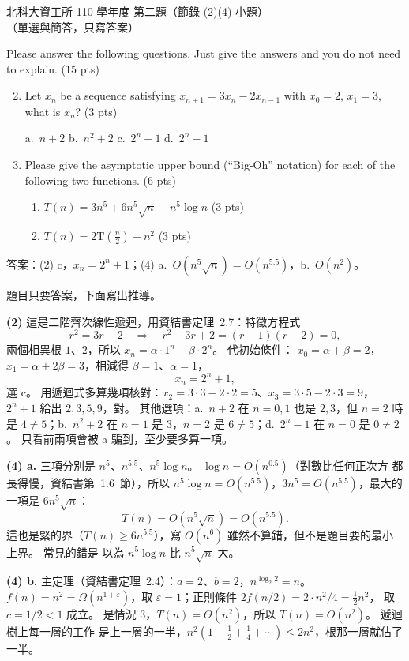 \begin{pastexam}[label={px:ntut-110-ci-01}]{北科大資工所 110 學年度 第二題（節錄 (2)(4) 小題）}
（單選與簡答，只寫答案）

Please answer the following questions. Just give the answers and you do not need to explain.
(15 pts)
\begin{enumerate}[label=(\arabic*)]
\setcounter{enumi}{1}
\item Let $x_n$ be a sequence satisfying $x_{n+1}=3x_n-2x_{n-1}$ with $x_0=2$, $x_1=3$, what is
$x_n$? (3 pts)

a.~$n+2$ \qquad b.~$n^2+2$ \qquad c.~$2^n+1$ \qquad d.~$2^n-1$
\setcounter{enumi}{3}
\item Please give the asymptotic upper bound (``Big-Oh'' notation) for each of the following two
functions. (6 pts)
\begin{enumerate}[label=\alph*.]
\item $T(n)=3n^5+6n^5\sqrt{n}+n^5\log n$ \quad (3 pts)
\item $T(n)=2\mathrm{T}(\frac{n}{2})+n^2$ \quad (3 pts)
\end{enumerate}
\end{enumerate}
\end{pastexam}

\begin{pastsoln}
答案：(2) c，$x_n = 2^n + 1$；(4) a.\ $O(n^5 \sqrt{n}) = O(n^{5.5})$，b.\ $O(n^2)$。

題目只要答案，下面寫出推導。

\textbf{(2)} 這是二階齊次線性遞迴，用資結書定理~2.7：特徵方程式
\[
r^2 = 3r - 2 \quad\Longrightarrow\quad r^2 - 3r + 2 = (r - 1)(r - 2) = 0 ,
\]
兩個相異根 $1$、$2$，所以 $x_n = \alpha \cdot 1^n + \beta \cdot 2^n$。 代初始條件：
$x_0 = \alpha + \beta = 2$，$x_1 = \alpha + 2\beta = 3$，相減得 $\beta = 1$、$\alpha = 1$，
\[
x_n = 2^n + 1 ,
\]
選 c。 用遞迴式多算幾項核對：$x_2 = 3 \cdot 3 - 2 \cdot 2 = 5$、$x_3 = 3 \cdot 5 - 2 \cdot 3 = 9$，
$2^n + 1$ 給出 $2, 3, 5, 9$，對。 其他選項：a.\ $n + 2$ 在 $n = 0, 1$ 也是 $2, 3$，但 $n = 2$ 時是
$4 \ne 5$；b.\ $n^2 + 2$ 在 $n = 1$ 是 $3$，$n = 2$ 是 $6 \ne 5$；d.\ $2^n - 1$ 在 $n = 0$ 是 $0 \ne 2$。
只看前兩項會被 a 騙到，至少要多算一項。

\textbf{(4) a.} 三項分別是 $n^5$、$n^{5.5}$、$n^5 \log n$。 $\log n = O(n^{0.5})$（對數比任何正次方
都長得慢，資結書第~1.6~節），所以 $n^5 \log n = O(n^{5.5})$，$3n^5 = O(n^{5.5})$，最大的一項是
$6n^5\sqrt{n}$：
\[
T(n) = O(n^5 \sqrt{n}) = O(n^{5.5}) .
\]
這也是緊的界（$T(n) \ge 6 n^{5.5}$），寫 $O(n^6)$ 雖然不算錯，但不是題目要的最小上界。 常見的錯是
以為 $n^5 \log n$ 比 $n^5\sqrt{n}$ 大。

\textbf{(4) b.} 主定理（資結書定理~2.4）：$a = 2$、$b = 2$，$n^{\log_2 2} = n$。 $f(n) = n^2 =
\Omega(n^{1 + \varepsilon})$，取 $\varepsilon = 1$；正則條件 $2 f(n/2) = 2 \cdot n^2/4 = \tfrac{1}{2} n^2$，
取 $c = 1/2 < 1$ 成立。 是情況 3，$T(n) = \Theta(n^2)$，所以 $T(n) = O(n^2)$。 遞迴樹上每一層的工作
是上一層的一半，$n^2 (1 + \tfrac12 + \tfrac14 + \cdots) \le 2n^2$，根那一層就佔了一半。
\end{pastsoln}
